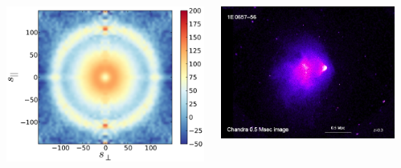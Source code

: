 \documentclass[aspectratio=169,xcolor=dvipsnames,,table,compress]{beamer}
\begin{document}
\begin{frame}
\begin{columns}[T]
\begin{column}{0.5\textwidth}
\begin{center}
\begin{columns}[T]
\begin{column}{0.33\textwidth}
            \includegraphics[width=\textwidth]{../figures/talk/cmb.png} 
          \end{column}
          \begin{column}{0.33\textwidth}
            \centering
            \includegraphics[width=\textwidth]{../figures/talk/bullet.png} 
          \end{column}
        \end{columns}
      \end{center}
      \pause 
    \end{column}
    \begin{column}{0.5\textwidth}
      \begin{center}

\end{center}
\end{column}
\end{columns}
\end{frame}
\end{document}
